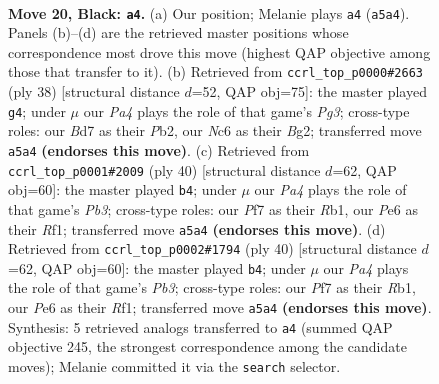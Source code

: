 \documentclass[11pt]{article}
\begin{document}
\clearpage

\begin{figure}[p]\centering
\begin{subfigure}{0.46\textwidth}\centering
\resizebox{\linewidth}{!}{%
\newchessgame
\chessboard[
  setfen={1r1r2k1/1p1bqppp/2n1p3/p1Pp4/3P3P/P1P2N2/RQ2BPP1/2R3K1 b - - 0 20},
  showmover=false,
  pgfstyle=straightmove, color=movearrow, markmove={a5-a4}
]}
\caption{}
\end{subfigure}\hfill
\begin{subfigure}{0.46\textwidth}\centering
\resizebox{\linewidth}{!}{%
\newchessgame
\chessboard[
  setfen={5rk1/1pq1np2/p2r1bpp/3p4/P1pP1P2/2N1P1P1/1P2Q1BP/R4R1K w - - 2 20},
  showmover=false,
  pgfstyle=straightmove, color=movearrow, markmove={g3-g4}
]}
\caption{}
\end{subfigure}
\\[4pt]
\begin{subfigure}{0.46\textwidth}\centering
\resizebox{\linewidth}{!}{%
\newchessgame
\chessboard[
  setfen={r4rk1/p1q2pp1/b1n2n1p/2pp4/8/PPN2NP1/4PPBP/1RQ2RK1 w - - 0 21},
  showmover=false,
  pgfstyle=straightmove, color=movearrow, markmove={b3-b4}
]}
\caption{}
\end{subfigure}\hfill
\begin{subfigure}{0.46\textwidth}\centering
\resizebox{\linewidth}{!}{%
\newchessgame
\chessboard[
  setfen={r4rk1/p1q2pp1/b1n2n1p/2pp4/8/PPN2NP1/4PPBP/1RQ2RK1 w - - 0 21},
  showmover=false,
  pgfstyle=straightmove, color=movearrow, markmove={b3-b4}
]}
\caption{}
\end{subfigure}
\caption{\textbf{Move 20, Black: \texttt{a4}.} (a) Our position; Melanie plays \texttt{a4} (\texttt{a5a4}). Panels (b)--(d) are the retrieved master positions whose correspondence most drove this move (highest QAP objective among those that transfer to it). (b) Retrieved from \texttt{ccrl\_top\_p0000\#2663} (ply 38) [structural distance $d$=52, QAP obj=75]: the master played \texttt{g4}; under $\mu$ our \emph{Pa4} plays the role of that game's \emph{Pg3}; cross-type roles: our \emph{B}d7 as their \emph{P}b2, our \emph{N}c6 as their \emph{B}g2; transferred move \texttt{a5a4} \textbf{(endorses this move)}. (c) Retrieved from \texttt{ccrl\_top\_p0001\#2009} (ply 40) [structural distance $d$=62, QAP obj=60]: the master played \texttt{b4}; under $\mu$ our \emph{Pa4} plays the role of that game's \emph{Pb3}; cross-type roles: our \emph{P}f7 as their \emph{R}b1, our \emph{P}e6 as their \emph{R}f1; transferred move \texttt{a5a4} \textbf{(endorses this move)}. (d) Retrieved from \texttt{ccrl\_top\_p0002\#1794} (ply 40) [structural distance $d$=62, QAP obj=60]: the master played \texttt{b4}; under $\mu$ our \emph{Pa4} plays the role of that game's \emph{Pb3}; cross-type roles: our \emph{P}f7 as their \emph{R}b1, our \emph{P}e6 as their \emph{R}f1; transferred move \texttt{a5a4} \textbf{(endorses this move)}. Synthesis: 5 retrieved analogs transferred to \texttt{a4} (summed QAP objective 245, the strongest correspondence among the candidate moves); Melanie committed it via the \texttt{search} selector.}
\label{fig:thought-m39}
\end{figure}
\end{document}
